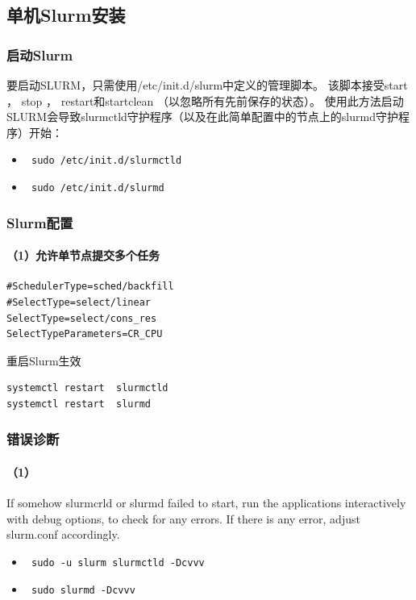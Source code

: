 {\subsection{单机Slurm安装}




\subsubsection{启动Slurm}
要启动SLURM，只需使用/etc/init.d/slurm中定义的管理脚本。 该脚本接受start ， stop ， restart和startclean （以忽略所有先前保存的状态）。 使用此方法启动SLURM会导致slurmctld守护程序（以及在此简单配置中的节点上的slurmd守护程序）开始：
\begin{itemize}
\item \verb| sudo /etc/init.d/slurmctld|

\item \verb| sudo /etc/init.d/slurmd|
\end{itemize}



\subsubsection{Slurm配置}
\paragraph{（1）允许单节点提交多个任务}
\begin{verbatim}
#SchedulerType=sched/backfill
#SelectType=select/linear
SelectType=select/cons_res
SelectTypeParameters=CR_CPU
\end{verbatim}
重启Slurm生效
\begin{verbatim}
systemctl restart  slurmctld
systemctl restart  slurmd
\end{verbatim}


\subsubsection{错误诊断}
\paragraph{（1）}
If somehow slurmcrld or slurmd failed to start, run the applications interactively with debug options, to check for any errors. If there is any error, adjust slurm.conf accordingly.
\begin{itemize}
\item \verb| sudo -u slurm slurmctld -Dcvvv |
\item \verb| sudo slurmd -Dcvvv |
\end{itemize}

}
